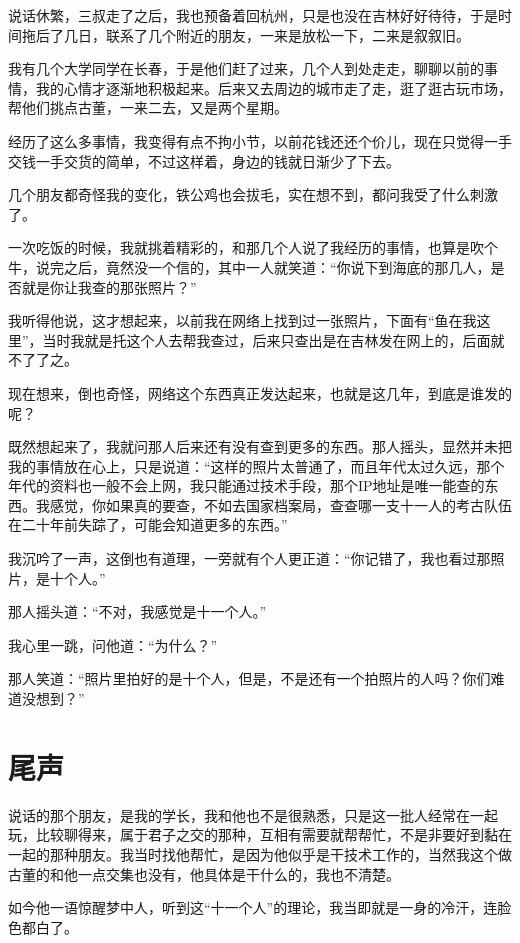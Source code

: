 说话休繁，三叔走了之后，我也预备着回杭州，只是也没在吉林好好待待，于是时间拖后了几日，联系了几个附近的朋友，一来是放松一下，二来是叙叙旧。

我有几个大学同学在长春，于是他们赶了过来，几个人到处走走，聊聊以前的事情，我的心情才逐渐地积极起来。后来又去周边的城市走了走，逛了逛古玩市场，帮他们挑点古董，一来二去，又是两个星期。

经历了这么多事情，我变得有点不拘小节，以前花钱还还个价儿，现在只觉得一手交钱一手交货的简单，不过这样着，身边的钱就日渐少了下去。

几个朋友都奇怪我的变化，铁公鸡也会拔毛，实在想不到，都问我受了什么刺激了。

一次吃饭的时候，我就挑着精彩的，和那几个人说了我经历的事情，也算是吹个牛，说完之后，竟然没一个信的，其中一人就笑道：“你说下到海底的那几人，是否就是你让我查的那张照片？”

我听得他说，这才想起来，以前我在网络上找到过一张照片，下面有“鱼在我这里”，当时我就是托这个人去帮我查过，后来只查出是在吉林发在网上的，后面就不了了之。

现在想来，倒也奇怪，网络这个东西真正发达起来，也就是这几年，到底是谁发的呢？

既然想起来了，我就问那人后来还有没有查到更多的东西。那人摇头，显然并未把我的事情放在心上，只是说道：“这样的照片太普通了，而且年代太过久远，那个年代的资料也一般不会上网，我只能通过技术手段，那个IP地址是唯一能查的东西。我感觉，你如果真的要查，不如去国家档案局，查查哪一支十一人的考古队伍在二十年前失踪了，可能会知道更多的东西。”

我沉吟了一声，这倒也有道理，一旁就有个人更正道：“你记错了，我也看过那照片，是十个人。”

那人摇头道：“不对，我感觉是十一个人。”

我心里一跳，问他道：“为什么？”

那人笑道：“照片里拍好的是十个人，但是，不是还有一个拍照片的人吗？你们难道没想到？”

\chapter{尾声}

说话的那个朋友，是我的学长，我和他也不是很熟悉，只是这一批人经常在一起玩，比较聊得来，属于君子之交的那种，互相有需要就帮帮忙，不是非要好到黏在一起的那种朋友。我当时找他帮忙，是因为他似乎是干技术工作的，当然我这个做古董的和他一点交集也没有，他具体是干什么的，我也不清楚。

如今他一语惊醒梦中人，听到这“十一个人”的理论，我当即就是一身的冷汗，连脸色都白了。

